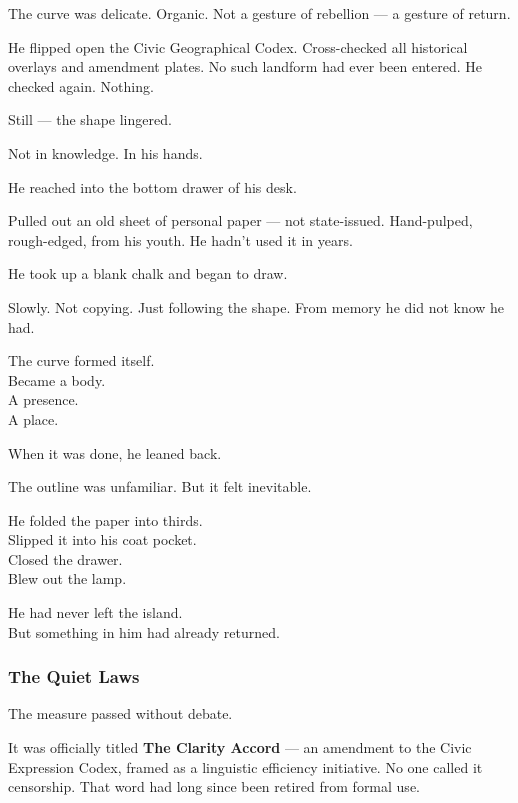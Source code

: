 \documentclass[12pt]{article}
\begin{document}
The curve was delicate. Organic. Not a gesture of rebellion --- a gesture of return.

He flipped open the Civic Geographical Codex. Cross-checked all historical overlays and amendment plates. No such landform had ever been entered. He checked again. Nothing.

Still --- the shape lingered.

Not in knowledge. In his hands.

\vspace{1em}

He reached into the bottom drawer of his desk.

Pulled out an old sheet of personal paper --- not state-issued. Hand-pulped, rough-edged, from his youth. He hadn’t used it in years.

He took up a blank chalk and began to draw.

Slowly. Not copying. Just following the shape. From memory he did not know he had.

The curve formed itself.\\
Became a body.\\
A presence.\\
A place.

When it was done, he leaned back.

The outline was unfamiliar. But it felt inevitable.

\vspace{1em}

He folded the paper into thirds.\\
Slipped it into his coat pocket.\\
Closed the drawer.\\
Blew out the lamp.

\vspace{1em}

He had never left the island.\\
But something in him had already returned.

\dotfill

\subsubsection*{The Quiet Laws}

The measure passed without debate.

It was officially titled \textbf{The Clarity Accord} --- an amendment to the Civic Expression Codex, framed as a linguistic efficiency initiative. No one called it censorship. That word had long since been retired from formal use.
\end{document}
